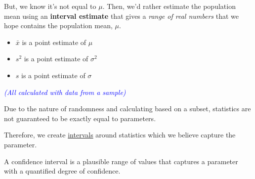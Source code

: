 \vspace{1em}

But, we know it’s not equal to $\mu$. Then, we’d rather estimate the population mean using an \textbf{interval estimate} that gives a \textit{range of real numbers} that we hope contains the population mean, $\mu$.
\vspace{1em}
\begin{example}

\begin{itemize}
    \item $\bar{x}$ is a point estimate of $\mu$
    \item $s^2$ is a point estimate of $\sigma^2$
    \item $s$ is a point estimate of $\sigma$
\end{itemize}

\vspace{0.5em}
\textcolor{blue}{\textit{(All calculated with data from a sample)}}

\end{example}

Due to the nature of randomness and calculating based on a subset, statistics are not guaranteed to be exactly equal to parameters.

\vspace{1em}

Therefore, we create \underline{intervals} around statistics which we believe capture the parameter.

\vspace{0.5em}

\noindent
\begin{definition}
A confidence interval is a plausible range of values that captures a parameter with a quantified degree of confidence.
\end{definition}



\vspace{1em}

\begin{center}
\end{center}

